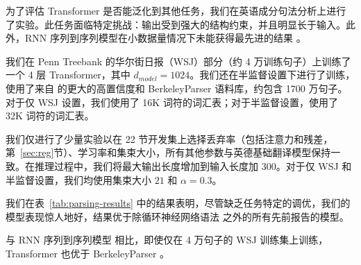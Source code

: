 为了评估 Transformer 是否能泛化到其他任务，我们在英语成分句法分析上进行了实验。此任务面临特定挑战：输出受到强大的结构约束，并且明显长于输入。此外，RNN 序列到序列模型在小数据量情况下未能获得最先进的结果 \cite{KVparse15}。

我们在 Penn Treebank \citep{marcus1993building} 的华尔街日报（WSJ）部分（约 4 万训练句子）上训练了一个 4 层 Transformer，其中 $d_{model} = 1024$。我们还在半监督设置下进行了训练，使用了来自 \citep{KVparse15} 的更大的高置信度和 BerkeleyParser 语料库，约包含 1700 万句子。对于仅 WSJ 设置，我们使用了 16K 词符的词汇表；对于半监督设置，使用了 32K 词符的词汇表。

我们仅进行了少量实验以在 22 节开发集上选择丢弃率（包括注意力和残差，第~\ref{sec:reg}节）、学习率和集束大小，所有其他参数与英德基础翻译模型保持一致。在推理过程中，我们将最大输出长度增加到输入长度加 $300$。对于仅 WSJ 和半监督设置，我们均使用集束大小 $21$ 和 $\alpha=0.3$。

我们在表~\ref{tab:parsing-results} 中的结果表明，尽管缺乏任务特定的调优，我们的模型表现惊人地好，结果优于除循环神经网络语法 \cite{dyer-rnng:16} 之外的所有先前报告的模型。

与 RNN 序列到序列模型 \citep{KVparse15} 相比，即使仅在 4 万句子的 WSJ 训练集上训练，Transformer 也优于 BerkeleyParser \cite{petrov-EtAl:2006:ACL}。
